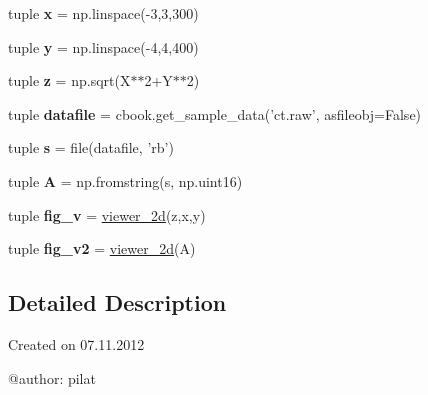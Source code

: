 \begin{DoxyCompactItemize}
\item 
\hypertarget{namespacemain_1_1on_click__lib_a8588f61e8f95bbc855a11e80b396b042}{tuple {\bfseries x} = np.\-linspace(-\/3,3,300)}\label{namespacemain_1_1on_click__lib_a8588f61e8f95bbc855a11e80b396b042}

\item 
\hypertarget{namespacemain_1_1on_click__lib_ae2566e7b4c921a5b467b332abfba09d8}{tuple {\bfseries y} = np.\-linspace(-\/4,4,400)}\label{namespacemain_1_1on_click__lib_ae2566e7b4c921a5b467b332abfba09d8}

\item 
\hypertarget{namespacemain_1_1on_click__lib_a457f9a5783780da7544a16e6ab024ff1}{tuple {\bfseries z} = np.\-sqrt(X$\ast$$\ast$2+Y$\ast$$\ast$2)}\label{namespacemain_1_1on_click__lib_a457f9a5783780da7544a16e6ab024ff1}

\item 
\hypertarget{namespacemain_1_1on_click__lib_a679a56f7ec87fdc25a43efcce8a3a620}{tuple {\bfseries datafile} = cbook.\-get\-\_\-sample\-\_\-data('ct.\-raw', asfileobj=False)}\label{namespacemain_1_1on_click__lib_a679a56f7ec87fdc25a43efcce8a3a620}

\item 
\hypertarget{namespacemain_1_1on_click__lib_af2709adc92ac7a8cdfdbef0e4539d237}{tuple {\bfseries s} = file(datafile, 'rb')}\label{namespacemain_1_1on_click__lib_af2709adc92ac7a8cdfdbef0e4539d237}

\item 
\hypertarget{namespacemain_1_1on_click__lib_a6bb20b6b30ccf339b1688967b68b7513}{tuple {\bfseries A} = np.\-fromstring(s, np.\-uint16)}\label{namespacemain_1_1on_click__lib_a6bb20b6b30ccf339b1688967b68b7513}

\item 
\hypertarget{namespacemain_1_1on_click__lib_ae359e62a7b8787baf359ed84e4fda49a}{tuple {\bfseries fig\-\_\-v} = \hyperlink{classmain_1_1on_click__lib_1_1viewer__2d}{viewer\-\_\-2d}(z,x,y)}\label{namespacemain_1_1on_click__lib_ae359e62a7b8787baf359ed84e4fda49a}

\item 
\hypertarget{namespacemain_1_1on_click__lib_a777b79b2459597c2944d2503d92fa876}{tuple {\bfseries fig\-\_\-v2} = \hyperlink{classmain_1_1on_click__lib_1_1viewer__2d}{viewer\-\_\-2d}(A)}\label{namespacemain_1_1on_click__lib_a777b79b2459597c2944d2503d92fa876}

\end{DoxyCompactItemize}


\subsection{Detailed Description}
\begin{DoxyVerb}Created on 07.11.2012

@author: pilat
\end{DoxyVerb}
 